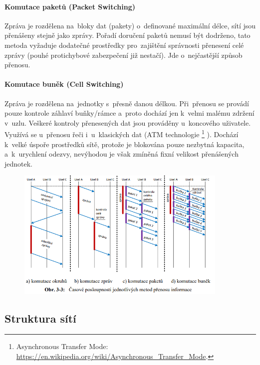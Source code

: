 \paragraph{Komutace paketů (Packet Switching)} Zpráva je rozdělena na~bloky dat (pakety) o~definované maximální délce, sítí jsou přenášeny stejně jako zprávy. Pořadí doručení paketů nemusí být dodrženo, tato metoda vyžaduje dodatečné prostředky pro~zajištění správnosti přenesení celé zprávy (pouhé protichybové zabezpečení již nestačí). Jde o~nejčastější způsob přenosu.

\paragraph{Komutace buněk (Cell Switching)} Zpráva je rozdělena na~jednotky s~přesně danou délkou. Při~přenosu se provádí pouze kontrole záhlaví buňky/rámce a~proto dochází jen k~velmi malému zdržení v~uzlu. Veškeré kontroly přenesených dat jsou prováděny u~koncového uživatele. Využívá se u~přenosu řeči i~u~klasických dat (ATM technologie%
\footnote{Asynchronous Transfer Mode: \url{https://en.wikipedia.org/wiki/Asynchronous_Transfer_Mode}.}%
). Dochází k~velké úspoře prostředků sítě, protože je blokována pouze nezbytná kapacita, a~k~urychlení odezvy, nevýhodou je však zmíněná fixní velikost přenášených jednotek.

\begin{figure}[ht]
	\centering
	\includegraphics[width=0.9\textwidth]{images/q01_switching}
\end{figure}

\subsection{Struktura sítí}

